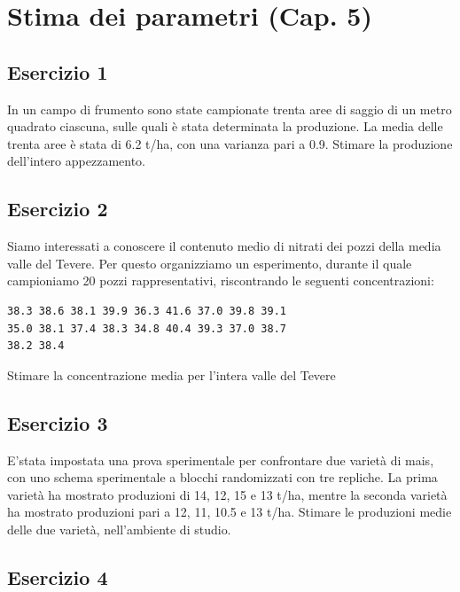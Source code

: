 \documentclass[a4paper,12pt,oneside]{book}
\begin{document}
\hypertarget{stima-dei-parametri-cap.-5}{%
\section{Stima dei parametri (Cap. 5)}\label{stima-dei-parametri-cap.-5}}

\hypertarget{esercizio-1-3}{%
\subsection{Esercizio 1}\label{esercizio-1-3}}

In un campo di frumento sono state campionate trenta aree di saggio di un metro quadrato ciascuna, sulle quali è stata determinata la produzione. La media delle trenta aree è stata di 6.2 t/ha, con una varianza pari a 0.9. Stimare la produzione dell'intero appezzamento.

\hypertarget{esercizio-2-3}{%
\subsection{Esercizio 2}\label{esercizio-2-3}}

Siamo interessati a conoscere il contenuto medio di nitrati dei pozzi della media valle del Tevere. Per questo organizziamo un esperimento, durante il quale campioniamo 20 pozzi rappresentativi, riscontrando le seguenti concentrazioni:

\begin{verbatim}
38.3 38.6 38.1 39.9 36.3 41.6 37.0 39.8 39.1     
35.0 38.1 37.4 38.3 34.8 40.4 39.3 37.0 38.7    
38.2 38.4    
\end{verbatim}

Stimare la concentrazione media per l'intera valle del Tevere

\hypertarget{esercizio-3-3}{%
\subsection{Esercizio 3}\label{esercizio-3-3}}

E'stata impostata una prova sperimentale per confrontare due varietà di mais, con uno schema sperimentale a blocchi randomizzati con tre repliche. La prima varietà ha mostrato produzioni di 14, 12, 15 e 13 t/ha, mentre la seconda varietà ha mostrato produzioni pari a 12, 11, 10.5 e 13 t/ha. Stimare le produzioni medie delle due varietà, nell'ambiente di studio.

\hypertarget{esercizio-4-3}{%
\subsection{Esercizio 4}\label{esercizio-4-3}}
\end{document}
